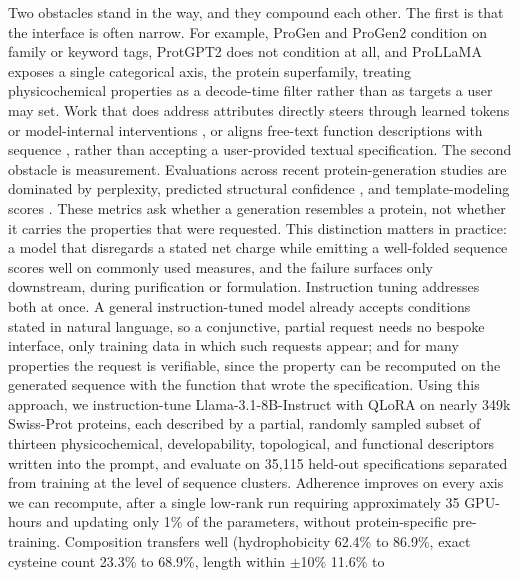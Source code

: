 \documentclass{article}
\newcommand{\pct}{\%}
\begin{document}
Two obstacles stand in the way, and they compound each other. The first is that the interface is often narrow. For example, 
ProGen and ProGen2 condition on family or keyword tags, ProtGPT2 does not
condition at all, and ProLLaMA \citep{lv2026prollama} exposes a single
categorical axis, the protein superfamily, treating physicochemical properties
as a decode-time filter rather than as targets a user may set. Work that does address attributes directly steers through learned tokens or model-internal interventions \citep{ismail2025cbplm, luo2026prefixprot, liu2025ctrlprot, hayes2025esm3}, or aligns free-text function descriptions with sequence \citep{liu2025proteindt, wang2024instructprotein}, rather than accepting a user-provided textual specification. The second obstacle is measurement. Evaluations across recent protein-generation studies \citep{madani2023progen,nijkamp2023progen2,
ferruz2022protgpt2} are dominated by perplexity, predicted structural confidence \citep{jumper2021alphafold}, and template-modeling scores \citep{zhang2004tmscore}. These metrics ask whether a generation resembles a protein, not whether it carries the properties that were requested. This distinction matters in practice: a model that disregards a stated net charge while emitting a well-folded sequence scores well on commonly used measures, and the failure surfaces only downstream, during purification or formulation.
Instruction tuning \citep{zhang2023instructiontuning} addresses both at once. A
general instruction-tuned model already accepts conditions stated in natural
language, so a conjunctive, partial request needs no bespoke interface, only
training data in which such requests appear; and for many properties the request
is verifiable, since the property can be recomputed on the generated sequence
with the function that wrote the specification.
Using this approach, we instruction-tune Llama-3.1-8B-Instruct \citep{dubey2024llama3} with QLoRA \citep{dettmers2023qlora,hu2022lora} on nearly 349k Swiss-Prot proteins, each
described by a partial, randomly sampled subset of thirteen physicochemical, developability, topological, and functional descriptors written into the prompt, and evaluate on
35{,}115 held-out specifications separated from training at the level of
sequence clusters. Adherence improves on every axis we can recompute, after a single low-rank run requiring approximately 35 GPU-hours and updating
only 1\pct{} of the parameters, without protein-specific pre-training.
Composition transfers well (hydrophobicity 62.4\pct{} to 86.9\pct, exact cysteine
count 23.3\pct{} to 68.9\pct, length within $\pm$10\pct{} 11.6\pct{} to
\end{document}
